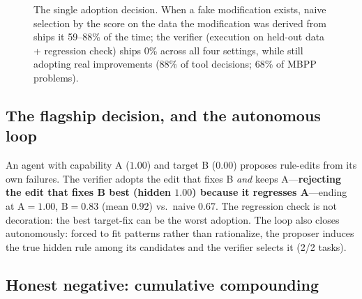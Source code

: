 \documentclass{article}
\begin{document}
\begin{figure}[t]
\centering
{}
\caption{The single adoption decision. When a fake modification exists, naive selection by the score on
the data the modification was derived from ships it 59--88\% of the time; the verifier (execution on
held-out data + regression check) ships 0\% across all four settings, while still adopting real
improvements (88\% of tool decisions; 68\% of MBPP problems).}
\label{fig:bars}
\end{figure}

\subsection{The flagship decision, and the autonomous loop}
\label{sec:flagship}

An agent with capability A ($1.00$) and target B ($0.00$) proposes rule-edits from its own failures. The
verifier adopts the edit that fixes B \emph{and} keeps A---\textbf{rejecting the edit that fixes B best
(hidden $1.00$) because it regresses A}---ending at $\text{A}=1.00$, $\text{B}=0.83$ (mean $0.92$) vs.\
naive $0.67$. The regression check is not decoration: the best target-fix can be the worst adoption. The
loop also closes autonomously: forced to fit patterns rather than rationalize, the proposer induces the
true hidden rule among its candidates and the verifier selects it (2/2 tasks).

\subsection{Honest negative: cumulative compounding}
\label{sec:negative}
\end{document}
